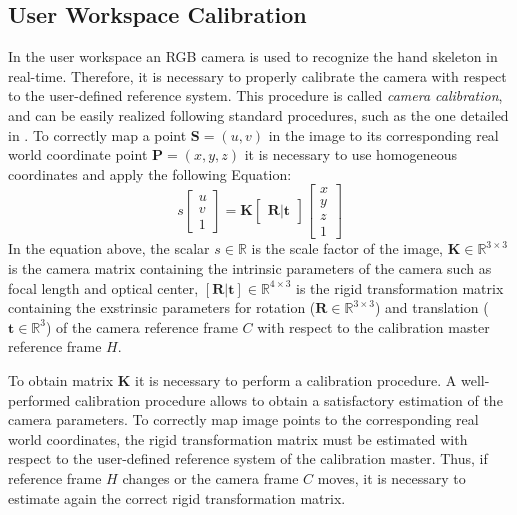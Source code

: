 \documentclass[letterpaper, 10 pt, conference]{ieeeconf}  %
\begin{document}
\subsection{User Workspace Calibration}
In the user workspace an RGB camera is used to recognize the hand skeleton in real-time. Therefore, it is necessary to properly calibrate the camera with respect to the user-defined reference system. This procedure is called \textit{camera calibration}, and can be easily realized following standard procedures, such as the one detailed in \cite{MatlabCameraCalib}.
To correctly map a point $\mathbf{S} = (u,v)$ in the image to its corresponding real world coordinate point $\mathbf{P} = (x,y,z)$ it is necessary to use homogeneous coordinates and apply the following Equation:
\begin{equation}
s 
  \begin{bmatrix}
    u \\
    v \\
    1
  \end{bmatrix}
 =
\mathbf{K}
  \begin{bmatrix}
    \mathbf{R} | \mathbf{t}
  \end{bmatrix}
  \begin{bmatrix}
    x \\
    y \\
    z \\
    1
  \end{bmatrix}
\label{eq1}
\end{equation}
In the equation above, the scalar $s\in\mathbb{R}$ is the scale factor of the image, $\mathbf{K}\in\mathbb{R}^{3\times3}$ is the camera matrix containing the intrinsic parameters of the camera such as focal length and optical center, $\mathbf{[R|t]}\in\mathbb{R}^{4\times3}$ is the rigid transformation matrix containing the exstrinsic parameters for rotation ($\mathbf{R}\in\mathbb{R}^{3\times3}$) and translation ($\mathbf{t}\in\mathbb{R}^3$) of the camera reference frame $C$ with respect to the calibration master reference frame $H$.

To obtain matrix \textbf{K} it is necessary to perform a calibration procedure. A well-performed calibration procedure allows to obtain a satisfactory estimation of the camera parameters. To correctly map image points to the corresponding real world coordinates, the rigid transformation matrix must be estimated with respect to the user-defined reference system of the calibration master. Thus, if reference frame $H$ changes or the camera frame $C$ moves, it is necessary to estimate again the correct rigid transformation matrix. %
\end{document}
